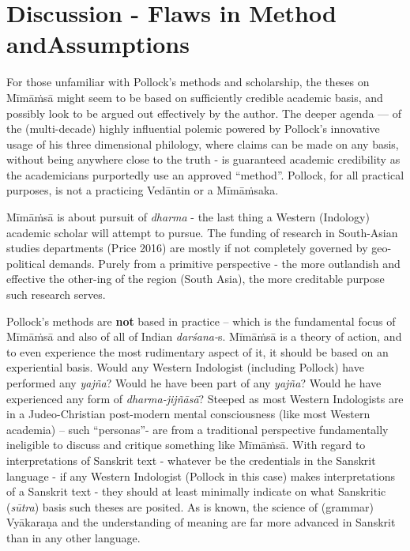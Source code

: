 \section*{Discussion - Flaws in Method and\hfill \break Assumptions}

\vskip -6pt

For those unfamiliar with Pollock’s methods and scholarship, the theses on Mīmāṁsā might seem to be based on sufficiently credible academic basis, and possibly look to be argued out effectively by the author. The deeper agenda — of the (multi-decade) highly influential polemic powered by Pollock’s innovative usage of his three dimensional philology, where claims can be made on any basis, without being anywhere close to the truth - is guaranteed academic credibility as the academicians purportedly use an approved “method”. Pollock, for all practical purposes, is not a practicing Vedāntin or a Mīmāṁsaka.

Mīmāṁsā is about pursuit of \textit{dharma} - the last thing a Western (Indology) academic scholar will attempt to pursue. The funding of research in South-Asian studies departments (Price 2016) are mostly if not completely governed by geo-political demands. Purely from a primitive perspective - the more outlandish and effective the other-ing of the region (South Asia), the more creditable purpose such research serves.

Pollock’s methods are \textbf{not} based in practice – which is the fundamental focus of Mīmāṁsā and also of all of Indian \textit{darśana-}s. Mīmāṁsā is a theory of action, and to even experience the most rudimentary aspect of it, it should be based on an experiential basis. Would any Western Indologist (including Pollock) have performed any \textit{yajña}? Would he have been part of any \textit{yajña}? Would he have experienced any form of \textit{dharma-jijñāsā}? Steeped as most Western Indologists are in a Judeo-Christian post-modern mental consciousness (like most Western academia) – such “personas”- are from a traditional perspective fundamentally ineligible to discuss and critique something like Mīmāṁsā. With regard to interpretations of Sanskrit text - whatever be the credentials in the Sanskrit language - if any Western Indologist (Pollock in this case) makes interpretations of a Sanskrit text - they should at least minimally indicate on what Sanskritic (\textit{sūtra}) basis such theses are posited. As is known, the science of (grammar) Vyākaraṇa and the understanding of meaning are far more advanced in Sanskrit than in any other language.


